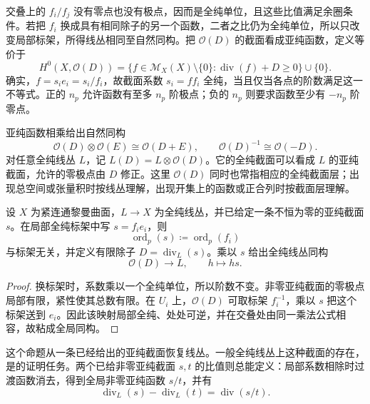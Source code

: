 交叠上的 \(f_i/f_j\) 没有零点也没有极点，因而是全纯单位，且这些比值满足余圈条件。若把 \(f_i\) 换成具有相同除子的另一个函数，二者之比仍为全纯单位，所以只改变局部标架，所得线丛相同至自然同构。把 \(\mathcal O(D)\) 的截面看成亚纯函数，定义等价于
\begin{equation}\label{g4:eq:0301:divisor-sections}
	H^0(X,\mathcal O(D))
	=\{f\in\mathcal M_X(X)\setminus\{0\}:\operatorname{div}(f)+D\ge0\}\cup\{0\}.
\end{equation}
确实，\(f=s_i e_i=s_i/f_i\)，故截面系数 \(s_i=ff_i\) 全纯，当且仅当各点的阶数满足这一不等式。正的 \(n_p\) 允许函数有至多 \(n_p\) 阶极点；负的 \(n_p\) 则要求函数至少有 \(-n_p\) 阶零点。

\ProseParagraphBreak

亚纯函数相乘给出自然同构
\[
	\mathcal O(D)\otimes\mathcal O(E)\cong\mathcal O(D+E),
	\qquad
	\mathcal O(D)^{-1}\cong\mathcal O(-D).
\]
对任意全纯线丛 \(L\)，记 \(L(D)=L\otimes\mathcal O(D)\)。它的全纯截面可以看成 \(L\) 的亚纯截面，允许的零极点由 \(D\) 修正。这里 \(\mathcal O(D)\) 同时也常指相应的全纯截面层；出现总空间或张量积时按线丛理解，出现开集上的函数或正合列时按截面层理解。

\begin{proposition}\label{g4:prop:0301:section-divisor}
	设 \(X\) 为紧连通黎曼曲面，\(L\to X\) 为全纯线丛，并已给定一条不恒为零的亚纯截面 \(s\)。在局部全纯标架中写 \(s=f_i e_i\)，则
	\[
		\operatorname{ord}_p(s)\coloneqq\operatorname{ord}_p(f_i)
	\]
	与标架无关，并定义有限除子 \(D=\operatorname{div}_L(s)\)。乘以 \(s\) 给出全纯线丛同构
	\[
		\mathcal O(D)\longrightarrow L,\qquad h\longmapsto hs.
	\]
\end{proposition}
\begin{proof}
	换标架时，系数乘以一个全纯单位，所以阶数不变。非零亚纯截面的零极点局部有限，紧性使其总数有限。在 \(U_i\) 上，\(\mathcal O(D)\) 可取标架 \(f_i^{-1}\)，乘以 \(s\) 把这个标架送到 \(e_i\)。因此该映射局部全纯、处处可逆，并在交叠处由同一乘法公式相容，故粘成全局同构。
\end{proof}

这个命题从一条已经给出的亚纯截面恢复线丛。一般全纯线丛上这种截面的存在，是的证明任务。两个已给非零亚纯截面 \(s,t\) 的比值则总能定义：局部系数相除时过渡函数消去，得到全局非零亚纯函数 \(s/t\)，并有
\[
	\operatorname{div}_L(s)-\operatorname{div}_L(t)
	=\operatorname{div}(s/t).
\]

